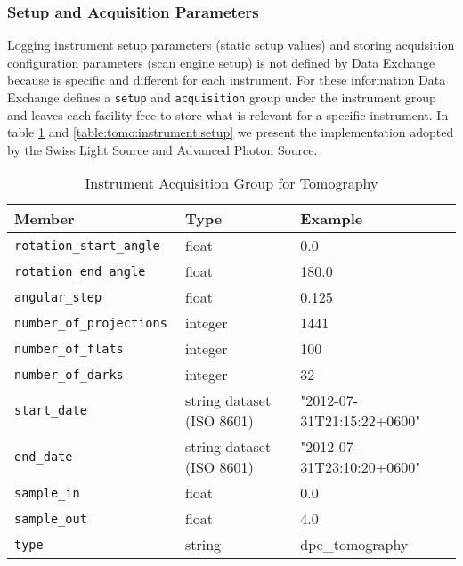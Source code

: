 \subsubsection{Setup and Acquisition Parameters}
\label{table:tomo:setup}
\label{table:tomo:acquisition}
Logging instrument setup parameters (static setup values) and storing acquisition configuration parameters (scan engine setup) is not defined by Data Exchange because is specific and different for each instrument. For these information Data Exchange defines a {\tt{setup}} and {\tt{acquisition}} group under the instrument group and leaves each facility free to store what is relevant for a specific instrument. In table  \ref{table:tomo:instrument:acquisition} and \ref{table:tomo:instrument:setup} we present the implementation adopted by the Swiss Light Source and Advanced Photon Source.


\begin{table}[h!]\sffamily \footnotesize
\centering
\caption{Instrument Acquisition Group for Tomography}
\begin{tabular}{l l l}
\toprule
\bfseries Member     & \bfseries Type & \bfseries Example \\
\midrule
\tt{rotation\_start\_angle} & float & 0.0 \\
\tt{rotation\_end\_angle} & float & 180.0 \\
\tt{angular\_step} & float & 0.125 \\
\tt{number\_of\_projections} & integer & 1441 \\
\tt{number\_of\_flats} & integer & 100 \\
\tt{number\_of\_darks} & integer & 32 \\
\tt{start\_date}  & string dataset (ISO 8601) & "2012-07-31T21:15:22+0600" \\    
\tt{end\_date}  & string dataset (ISO 8601) & "2012-07-31T23:10:20+0600" \\    
\tt{sample\_in} & float & 0.0 \\
\tt{sample\_out} & float & 4.0 \\
\tt{type} & string & dpc\_tomography \\
\bottomrule
\end{tabular}
\label{table:tomo:instrument:acquisition}
\end{table}

